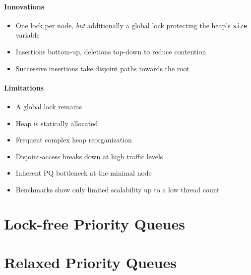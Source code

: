 \documentclass[usenames,dvipsnames]{beamer}
\begin{document}
\begin{frame}{}
\framesubtitle{Innovations}

\begin{itemize}
\item One lock per node, \emph{but} additionally a global lock protecting the heap's
      \lstinline|size| variable
\item Insertions bottom-up, deletions top-down to reduce contention
\item Successive insertions take disjoint paths towards the root
\end{itemize}
\end{frame}

\begin{frame}{}
\framesubtitle{Limitations}

\begin{itemize}
\item A global lock remains
\item Heap is statically allocated
\item Frequent complex heap reorganization
\item Disjoint-access breaks down at high traffic levels
\item Inherent PQ bottleneck at the minimal node
\item Benchmarks show only limited scalability up to a low thread count
\end{itemize}
\end{frame}

\section{Lock-free Priority Queues} \label{sec:lockfree}

\begin{frame}{}

\end{frame}

\section{Relaxed Priority Queues} \label{sec:relaxed}
\end{document}

